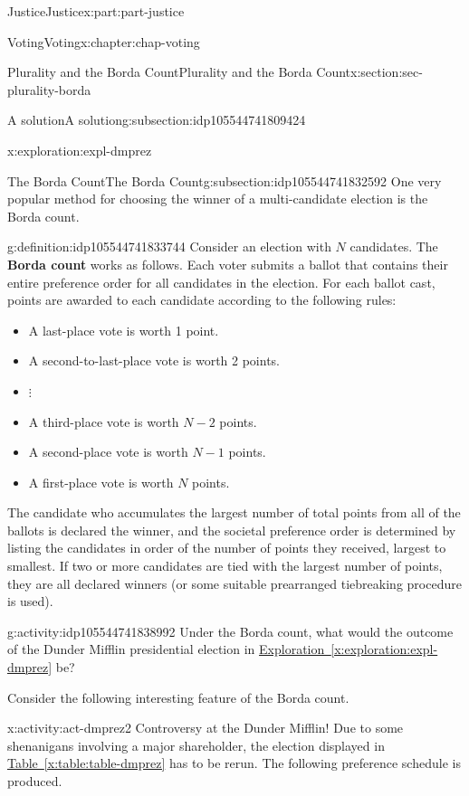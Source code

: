\documentclass[oneside,10pt,]{book}
\newcommand{\xreffont}{\relax}
\newcommand{\terminology}[1]{\textbf{#1}}
\numberwithin{equation}{section}
\begin{document}
\begin{partptx}{Justice}{}{Justice}{}{}{x:part:part-justice}
\begin{chapterptx}{Voting}{}{Voting}{}{}{x:chapter:chap-voting}
\begin{sectionptx}{Plurality and the Borda Count}{}{Plurality and the Borda Count}{}{}{x:section:sec-plurality-borda}
\begin{subsectionptx}{A solution}{}{A solution}{}{}{g:subsection:idp105544741809424}
\begin{exploration}{}{x:exploration:expl-dmprez}
\end{exploration}%
\end{subsectionptx}
%
%
\typeout{************************************************}
\typeout{************************************************}
%
\begin{subsectionptx}{The Borda Count}{}{The Borda Count}{}{}{g:subsection:idp105544741832592}
One very popular method for choosing the winner of a multi-candidate election is the Borda count.%
\begin{definition}{}{g:definition:idp105544741833744}%
%
%
Consider an election with \(N\) candidates. The \terminology{Borda count} works as follows. Each voter submits a ballot that contains their entire preference order for all candidates in the election. For each ballot cast, points are awarded to each candidate according to the following rules:%
%
\begin{itemize}[label=\textbullet]
\item{}A last-place vote is worth 1 point.%
\item{}A second-to-last-place vote is worth 2 points.%
\item{}\(\displaystyle \vdots\)%
\item{}A third-place vote is worth \(N-2\) points.%
\item{}A second-place vote is worth \(N-1\) points.%
\item{}A first-place vote is worth \(N\) points.%
\end{itemize}
The candidate who accumulates the largest number of total points from all of the ballots is declared the winner, and the societal preference order is determined by listing the candidates in order of the number of points they received, largest to smallest. If two or more candidates are tied with the largest number of points, they are all declared winners (or some suitable prearranged tiebreaking procedure is used).%
\end{definition}
\begin{activity}{}{g:activity:idp105544741838992}%
Under the Borda count, what would the outcome of the Dunder Mifflin presidential election in \hyperref[x:exploration:expl-dmprez]{Exploration~{\xreffont\ref{x:exploration:expl-dmprez}}} be?%
\end{activity}%
Consider the following interesting feature of the Borda count.%
\begin{activity}{}{x:activity:act-dmprez2}%
Controversy at the Dunder Mifflin! Due to some shenanigans involving a major shareholder, the election displayed in \hyperref[x:table:table-dmprez]{Table~{\xreffont\ref{x:table:table-dmprez}}} has to be rerun. The following preference schedule is produced.%

\end{activity}
\end{subsectionptx}
\end{sectionptx}
\end{chapterptx}
\end{partptx}
\end{document}
